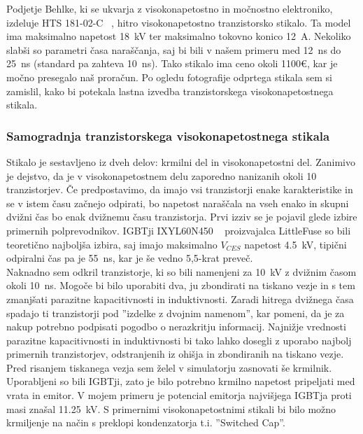 \documentclass[a4paper,twoside,openright,12pt,Slovene]{book}
\begin{document}
	Podjetje Behlke, ki se ukvarja z visokonapetostno in močnostno elektroniko, izdeluje HTS 181-02-C ~\cite{Behlke:HTS181-02-C}, hitro visokonapetostno tranzistorsko stikalo. Ta model ima maksimalno napetost \SI{18}{\kilo\volt} ter maksimalno tokovno konico \SI{12}{\ampere}. Nekoliko slabši so parametri časa naraščanja, saj bi bili v našem primeru med \SI{12}{\nano\second} do \SI{25}{\nano\second} (standard pa zahteva \SI{10}{\nano\second}). Tako stikalo ima ceno okoli 1100\euro , kar je močno presegalo naš proračun. Po ogledu fotografije odprtega stikala sem si zamislil, kako bi potekala lastna izvedba tranzistorskega visokonapetostnega stikala.
	
	\subsubsection{Samogradnja tranzistorskega visokonapetostnega stikala} \label{Samogradnja tranzistorskega visokonapetostnega stikala}
	
	Stikalo je sestavljeno iz dveh delov: krmilni del in visokonapetostni del. Zanimivo je dejstvo, da je v visokonapetostnem delu zaporedno nanizanih okoli 10 tranzistorjev. Če predpostavimo, da imajo vsi tranzistorji enake karakteristike in se v istem času začnejo odpirati, bo napetost naraščala na vseh enako in skupni dvižni čas bo enak dvižnemu času tranzistorja. Prvi izziv se je pojavil glede izbire primernih polprevodnikov. IGBTji IXYL60N450 ~\cite{IXYS:IXYL60N450} proizvajalca LittleFuse so bili teoretično najboljša izbira, saj imajo maksimalno \(V_{CES}\) napetost \SI{4,5}{\kilo\volt}, tipični odpiralni čas pa je \SI{55}{\nano\second}, kar je še vedno 5,5-krat preveč. 
    ~\\Naknadno sem odkril tranzistorje, ki so bili namenjeni za \SI{10}{\kilo\volt} z dvižnim časom okoli \SI{10}{\nano\second}. Mogoče bi bilo uporabiti dva, ju zbondirati na tiskano vezje in s tem zmanjšati parazitne kapacitivnosti in induktivnosti. Zaradi hitrega dvižnega časa spadajo ti tranzistorji pod ''izdelke z dvojnim namenom'', kar pomeni, da je za nakup potrebno podpisati pogodbo o nerazkritju informacij. Najnižje vrednosti parazitne kapacitivnosti in induktivnosti bi tako lahko dosegli z uporabo najbolj primernih tranzistorjev, odstranjenih iz ohišja in zbondiranih na tiskano vezje. Pred risanjem tiskanega vezja sem želel v simulatorju zasnovati še krmilnik. Uporabljeni so bili IGBTji, zato je bilo potrebno krmilno napetost pripeljati med vrata in emitor. V mojem primeru je potencial emitorja najvišjega IGBTja proti masi znašal \SI{11,25}{\kilo\volt}. S primernimi visokonapetostnimi stikali bi bilo možno krmiljenje na način s preklopi kondenzatorja t.i. ''Switched Cap''.
\end{document}
